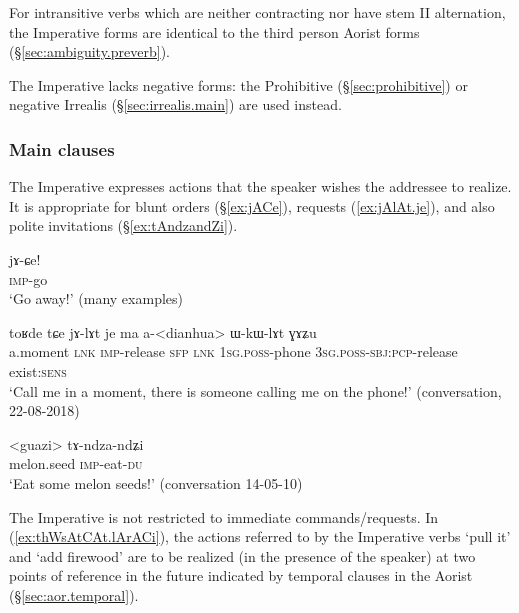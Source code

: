 For intransitive verbs which are neither contracting nor have stem II alternation, the Imperative forms are identical to the third person Aorist forms (§\ref{sec:ambiguity.preverb}).

The Imperative lacks negative forms: the Prohibitive (§\ref{sec:prohibitive}) or negative Irrealis (§\ref{sec:irrealis.main}) are used instead.
 
\subsubsection{Main clauses} \label{sec:imp.function}
The Imperative expresses actions that the speaker wishes the addressee to realize. It is appropriate for blunt orders (§\ref{ex:jACe}), requests (\ref{ex:jAlAt.je}), and also polite invitations (§\ref{ex:tAndzandZi}).

\begin{exe}
\ex \label{ex:jACe}
\gll jɤ-ɕe! \\
\textsc{imp}-go \\
\glt `Go away!' (many examples)
\end{exe}

\begin{exe}
\ex \label{ex:jAlAt.je}
\gll toʁde tɕe jɤ-lɤt je ma a-<dianhua> ɯ-kɯ-lɤt ɣɤʑu \\
 a.moment \textsc{lnk} \textsc{imp}-release \textsc{sfp} \textsc{lnk} \textsc{1sg}.\textsc{poss}-phone \textsc{3sg}.\textsc{poss}-\textsc{sbj}:\textsc{pcp}-release exist:\textsc{sens} \\
\glt `Call me in a moment, there is someone calling me on the phone!' (conversation, 22-08-2018)
\end{exe}

\begin{exe}
\ex \label{ex:tAndzandZi}
\gll <guazi> tɤ-ndza-ndʑi \\
melon.seed \textsc{imp}-eat-\textsc{du} \\
\glt `Eat some melon seeds!' (conversation 14-05-10)
\end{exe}

The Imperative is not restricted to immediate commands/requests. In (\ref{ex:thWsAtCAt.lArACi}), the actions referred to by the Imperative verbs  `pull it' and  `add firewood' are to be realized (in the presence of the speaker) at two points of reference in the future indicated by temporal clauses in the Aorist (§\ref{sec:aor.temporal}).

